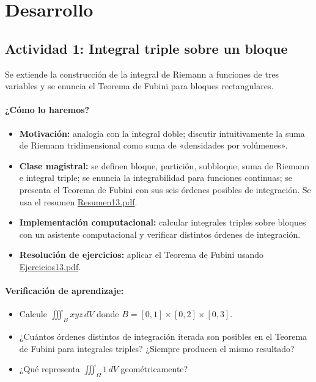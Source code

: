\documentclass[a4,11pt]{aleph-notas}
\begin{document}
\section*{Desarrollo}

\subsection*{Actividad 1: Integral triple sobre un bloque}
Se extiende la construcción de la integral de Riemann a funciones de tres variables y se enuncia el Teorema de Fubini para bloques rectangulares.

\paragraph{¿Cómo lo haremos?}
\begin{itemize}[leftmargin=*]
    \item \textbf{Motivación:} analogía con la integral doble; discutir intuitivamente la suma de Riemann tridimensional como suma de «densidades por volúmenes».
    \item \textbf{Clase magistral:} se definen bloque, partición, subbloque, suma de Riemann e integral triple; se enuncia la integrabilidad para funciones continuas; se presenta el Teorema de Fubini con sus seis órdenes posibles de integración. Se usa el resumen \href{https://andres-merino.github.io/MatematicaIII-05-N0051/01Resumen/Resumen13.pdf}{Resumen13.pdf}.
    \item \textbf{Implementación computacional:} calcular integrales triples sobre bloques con un asistente computacional y verificar distintos órdenes de integración.
    \item \textbf{Resolución de ejercicios:} aplicar el Teorema de Fubini usando \href{https://andres-merino.github.io/MatematicaIII-05-N0051/04Ejercicios/Ejercicios13.pdf}{Ejercicios13.pdf}.
\end{itemize}

\paragraph{Verificación de aprendizaje:}
\begin{itemize}[leftmargin=*]
    \item Calcule $\iiint_B xyz\,dV$ donde $B=[0,1]\times[0,2]\times[0,3]$.
    \item ¿Cuántos órdenes distintos de integración iterada son posibles en el Teorema de Fubini para integrales triples? ¿Siempre producen el mismo resultado?
    \item ¿Qué representa $\iiint_\Omega 1\,dV$ geométricamente?
\end{itemize}
\end{document}
